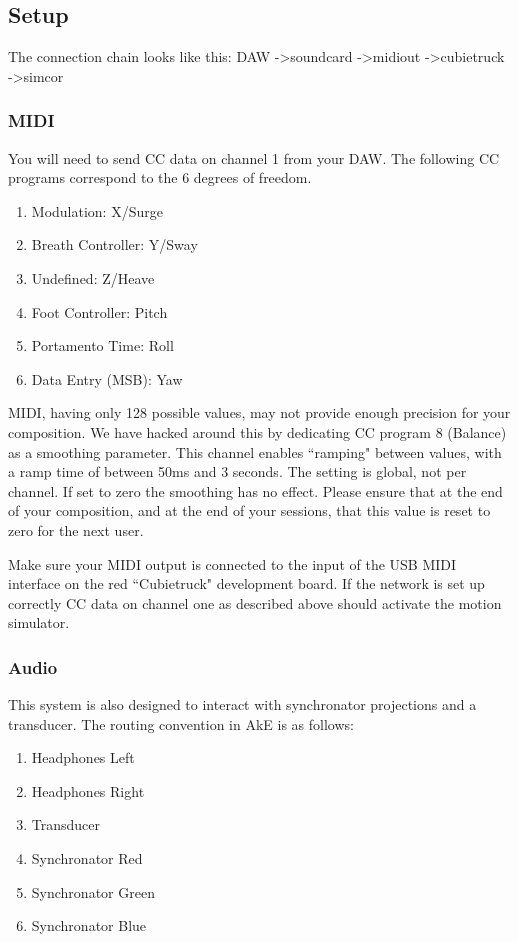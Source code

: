 \documentclass{article}
\begin{document}
	\subsection{Setup}
	The connection chain looks like this: \newline
	DAW -\textgreater soundcard -\textgreater midiout -\textgreater cubietruck 
	-\textgreater simcor \smallskip

	\subsubsection{MIDI}
	You will need to send CC data on channel 1 from your DAW. The following CC
	programs correspond to the 6 degrees of freedom.

	\begin{enumerate}
		\item  Modulation: X/Surge
		\item  Breath Controller: Y/Sway
		\item  Undefined: Z/Heave
		\item  Foot Controller: Pitch
		\item  Portamento Time: Roll
		\item  Data Entry (MSB): Yaw
	\end{enumerate}

	MIDI, having only 128 possible values, may not provide enough precision for 
	your composition. We have hacked around this by dedicating CC program 8 
	(Balance) as a smoothing parameter. This channel enables ``ramping" between 
	values, with a ramp time of between 50ms and 3 seconds. The setting is 
	global, not per channel. If set to zero the smoothing has no effect. Please 
	ensure that at the end of your composition, and at the end of your 
	sessions, that this value is reset to zero for the next user.

	Make sure your MIDI output is connected to the input of the USB MIDI 
	interface on the red ``Cubietruck" development board. If the network is set 
	up correctly CC data on channel one as described above should activate the 
	motion simulator.

	\subsubsection{Audio}
	This system is also designed to interact with synchronator projections and 	
	a transducer. The routing convention in AkE is as follows:

	\begin{enumerate}
		\item Headphones Left
		\item Headphones Right
		\item Transducer
		\item Synchronator Red
		\item Synchronator Green
		\item Synchronator Blue
	\end{enumerate}
\end{document}

